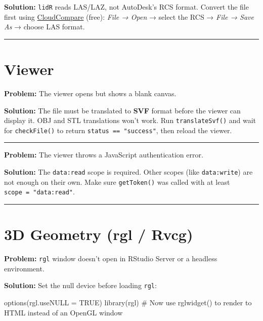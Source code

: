 \documentclass[
  11pt,
  letterpaper,
  DIV=11,
  numbers=noendperiod]{scrreprt}
\newenvironment{Shaded}{\begin{snugshade}}{\end{snugshade}}
\newcommand{\AttributeTok}[1]{\textcolor[rgb]{0.40,0.45,0.13}{#1}}
\newcommand{\CommentTok}[1]{\textcolor[rgb]{0.37,0.37,0.37}{#1}}
\newcommand{\ConstantTok}[1]{\textcolor[rgb]{0.56,0.35,0.01}{#1}}
\newcommand{\FunctionTok}[1]{\textcolor[rgb]{0.28,0.35,0.67}{#1}}
\newcommand{\NormalTok}[1]{\textcolor[rgb]{0.00,0.23,0.31}{#1}}
\begin{document}
\textbf{Solution:} \texttt{lidR} reads LAS/LAZ, not AutoDesk's RCS
format. Convert the file first using
\href{https://www.cloudcompare.org/}{CloudCompare} (free): \emph{File →
Open} → select the RCS → \emph{File → Save As} → choose LAS format.

\begin{center}\rule{0.5\linewidth}{0.5pt}\end{center}

\section{Viewer}\label{viewer-2}

\textbf{Problem:} The viewer opens but shows a blank canvas.

\textbf{Solution:} The file must be translated to \textbf{SVF} format
before the viewer can display it. OBJ and STL translations won't work.
Run \texttt{translateSvf()} and wait for \texttt{checkFile()} to return
\texttt{status\ ==\ "success"}, then reload the viewer.

\begin{center}\rule{0.5\linewidth}{0.5pt}\end{center}

\textbf{Problem:} The viewer throws a JavaScript authentication error.

\textbf{Solution:} The \texttt{data:read} scope is required. Other
scopes (like \texttt{data:write}) are not enough on their own. Make sure
\texttt{getToken()} was called with at least
\texttt{scope\ =\ "data:read"}.

\begin{center}\rule{0.5\linewidth}{0.5pt}\end{center}

\section{3D Geometry (rgl / Rvcg)}\label{d-geometry-rgl-rvcg}

\textbf{Problem:} \texttt{rgl} window doesn't open in RStudio Server or
a headless environment.

\textbf{Solution:} Set the null device before loading \texttt{rgl}:

\begin{Shaded}
\begin{Highlighting}[]
\FunctionTok{options}\NormalTok{(}\AttributeTok{rgl.useNULL =} \ConstantTok{TRUE}\NormalTok{)}
\FunctionTok{library}\NormalTok{(rgl)}
\CommentTok{\# Now use rglwidget() to render to HTML instead of an OpenGL window}
\end{Highlighting}
\end{Shaded}
\end{document}
